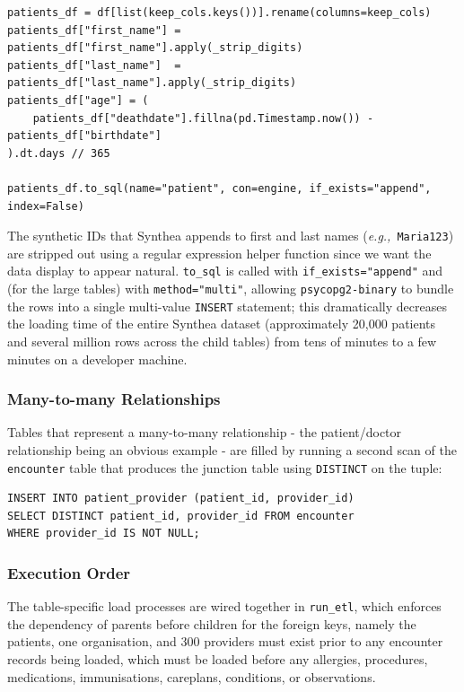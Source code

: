 \begin{lstlisting}[style=pythonstyle]
patients_df = df[list(keep_cols.keys())].rename(columns=keep_cols)
patients_df["first_name"] = patients_df["first_name"].apply(_strip_digits)
patients_df["last_name"]  = patients_df["last_name"].apply(_strip_digits)
patients_df["age"] = (
    patients_df["deathdate"].fillna(pd.Timestamp.now()) - patients_df["birthdate"]
).dt.days // 365

patients_df.to_sql(name="patient", con=engine, if_exists="append", index=False)
\end{lstlisting}

\noindent The synthetic IDs that Synthea appends to first and last names (\textit{e.g.,}\ \texttt{Maria123}) are stripped out using a regular expression helper function since we want the data display to appear natural. \texttt{to\_sql} is called with \texttt{if\_exists="append"} and (for the large tables) with \texttt{method="multi"}, allowing \texttt{psycopg2-binary} to bundle the rows into a single multi-value \texttt{INSERT} statement; this dramatically decreases the loading time of the entire Synthea dataset (approximately 20{,}000 patients and several million rows across the child tables) from tens of minutes to a few minutes on a developer machine.

\subsubsection*{Many-to-many Relationships}

Tables that represent a many-to-many relationship - the patient/doctor relationship being an obvious example - are filled by running a second scan of the \texttt{encounter} table that produces the junction table using \texttt{DISTINCT} on the tuple:

\begin{lstlisting}[style=sqlstyle]
INSERT INTO patient_provider (patient_id, provider_id)
SELECT DISTINCT patient_id, provider_id FROM encounter
WHERE provider_id IS NOT NULL;
\end{lstlisting}

\subsubsection*{Execution Order}

The table-specific load processes are wired together in \texttt{run\_etl}, which enforces the dependency of parents before children for the foreign keys, namely the patients, one organisation, and 300 providers must exist prior to any encounter records being loaded, which must be loaded before any allergies, procedures, medications, immunisations, careplans, conditions, or observations.


